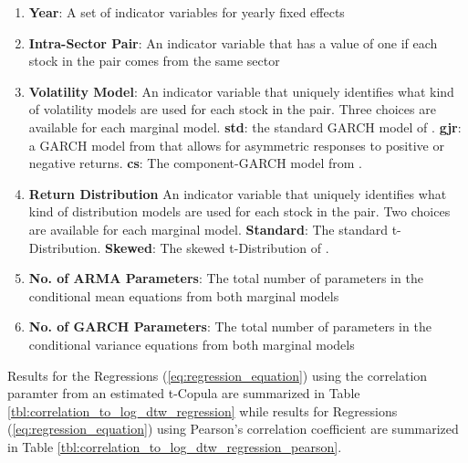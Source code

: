\begin{enumerate}
    \item \textbf{Year}: A set of indicator variables for yearly fixed effects
    \item \textbf{Intra-Sector Pair}: An indicator variable that has a value of one if each stock in the pair comes from the same sector
    \item \textbf{Volatility Model}: An indicator variable that uniquely identifies what kind of volatility models are used for each stock in the pair. Three choices are available for each marginal model. \textbf{std}: the standard GARCH model of \cite{Bollerslev1986Garch}. \textbf{gjr}: a GARCH model from \cite{GJR_1993} that allows for asymmetric responses to positive or negative returns. \textbf{cs}: The component-GARCH model from \cite{EngleLee1993APA}.
    \item \textbf{Return Distribution} An indicator variable that uniquely identifies what kind of distribution models are used for each stock in the pair. Two choices are available for each marginal model. \textbf{Standard}: The standard t-Distribution. \textbf{Skewed}: The skewed t-Distribution of \cite{Fernandez_Steel_1998}.
    \item \textbf{No. of ARMA Parameters}: The total number of parameters in the conditional mean equations from both marginal models
    \item \textbf{No. of GARCH Parameters}: The total number of parameters in the conditional variance equations from both marginal models
\end{enumerate}

Results for the Regressions (\ref{eq:regression_equation}) using the correlation paramter from an estimated t-Copula are summarized in Table \ref{tbl:correlation_to_log_dtw_regression} while results for Regressions (\ref{eq:regression_equation}) using Pearson's correlation coefficient are summarized in Table \ref{tbl:correlation_to_log_dtw_regression_pearson}.


